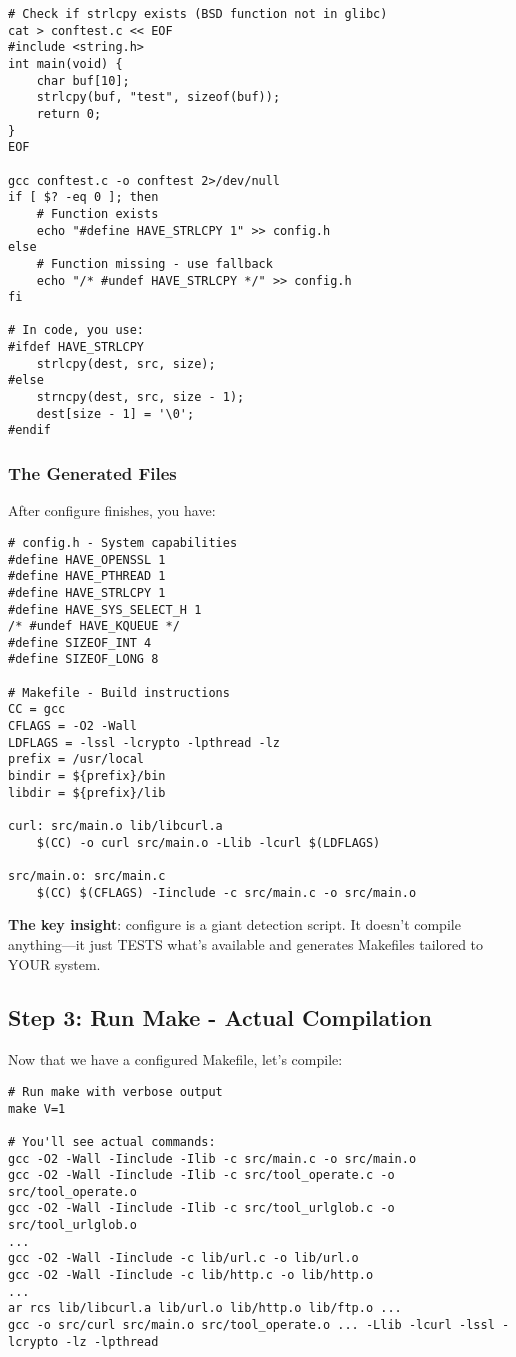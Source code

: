\begin{lstlisting}
# Check if strlcpy exists (BSD function not in glibc)
cat > conftest.c << EOF
#include <string.h>
int main(void) {
    char buf[10];
    strlcpy(buf, "test", sizeof(buf));
    return 0;
}
EOF

gcc conftest.c -o conftest 2>/dev/null
if [ $? -eq 0 ]; then
    # Function exists
    echo "#define HAVE_STRLCPY 1" >> config.h
else
    # Function missing - use fallback
    echo "/* #undef HAVE_STRLCPY */" >> config.h
fi

# In code, you use:
#ifdef HAVE_STRLCPY
    strlcpy(dest, src, size);
#else
    strncpy(dest, src, size - 1);
    dest[size - 1] = '\0';
#endif
\end{lstlisting}

\subsubsection{The Generated Files}

After configure finishes, you have:

\begin{lstlisting}
# config.h - System capabilities
#define HAVE_OPENSSL 1
#define HAVE_PTHREAD 1
#define HAVE_STRLCPY 1
#define HAVE_SYS_SELECT_H 1
/* #undef HAVE_KQUEUE */
#define SIZEOF_INT 4
#define SIZEOF_LONG 8

# Makefile - Build instructions
CC = gcc
CFLAGS = -O2 -Wall
LDFLAGS = -lssl -lcrypto -lpthread -lz
prefix = /usr/local
bindir = ${prefix}/bin
libdir = ${prefix}/lib

curl: src/main.o lib/libcurl.a
	$(CC) -o curl src/main.o -Llib -lcurl $(LDFLAGS)

src/main.o: src/main.c
	$(CC) $(CFLAGS) -Iinclude -c src/main.c -o src/main.o
\end{lstlisting}

\textbf{The key insight}: configure is a giant detection script. It doesn't compile anything---it just TESTS what's available and generates Makefiles tailored to YOUR system.

\subsection{Step 3: Run Make - Actual Compilation}

Now that we have a configured Makefile, let's compile:

\begin{lstlisting}
# Run make with verbose output
make V=1

# You'll see actual commands:
gcc -O2 -Wall -Iinclude -Ilib -c src/main.c -o src/main.o
gcc -O2 -Wall -Iinclude -Ilib -c src/tool_operate.c -o src/tool_operate.o
gcc -O2 -Wall -Iinclude -Ilib -c src/tool_urlglob.c -o src/tool_urlglob.o
...
gcc -O2 -Wall -Iinclude -c lib/url.c -o lib/url.o
gcc -O2 -Wall -Iinclude -c lib/http.c -o lib/http.o
...
ar rcs lib/libcurl.a lib/url.o lib/http.o lib/ftp.o ...
gcc -o src/curl src/main.o src/tool_operate.o ... -Llib -lcurl -lssl -lcrypto -lz -lpthread
\end{lstlisting}

